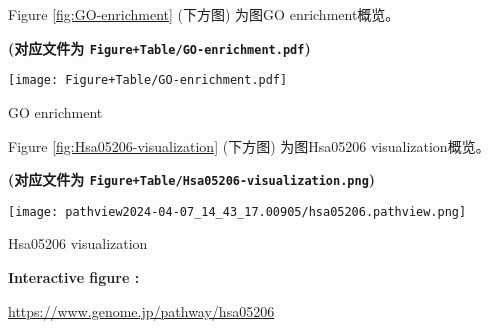 \documentclass[
]{article}
\begin{document}
\begin{center}\vspace{1.5cm}\end{center}

\begin{center}\vspace{1.5cm}\end{center}

Figure \ref{fig:GO-enrichment} (下方图) 为图GO enrichment概览。

\textbf{(对应文件为 \texttt{Figure+Table/GO-enrichment.pdf})}

\def\@captype{figure}
\begin{center}
\texttt{[image: Figure+Table/GO-enrichment.pdf]}
\caption{GO enrichment}\label{fig:GO-enrichment}
\end{center}

\begin{center}\vspace{1.5cm}\end{center}

\begin{center}\vspace{1.5cm}\end{center}

Figure \ref{fig:Hsa05206-visualization} (下方图) 为图Hsa05206 visualization概览。

\textbf{(对应文件为 \texttt{Figure+Table/Hsa05206-visualization.png})}

\def\@captype{figure}
\begin{center}
\texttt{[image: pathview2024-04-07\_14\_43\_17.00905/hsa05206.pathview.png]}
\caption{Hsa05206 visualization}\label{fig:Hsa05206-visualization}
\end{center}
\begin{center}\begin{tcolorbox}[colback=gray!10, colframe=gray!50, width=0.9\linewidth, arc=1mm, boxrule=0.5pt]
\textbf{
Interactive figure
:}

\vspace{0.5em}

    \url{https://www.genome.jp/pathway/hsa05206}

\vspace{2em}
\end{tcolorbox}
\end{center}
\end{document}
